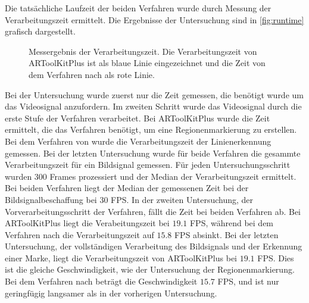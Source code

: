 Die tatsächliche Laufzeit der beiden Verfahren wurde durch Messung der Verarbeitungszeit ermittelt. Die Ergebnisse der Untersuchung sind in \autoref{fig:runtime} grafisch dargestellt.
\begin{figure}[!ht]
	\centering
	
	\caption{Messergebnis der Verarbeitungszeit. Die Verarbeitungszeit von ARToolKitPlus ist als blaue Linie
	 eingezeichnet und die Zeit von dem Verfahren nach \citeauthor{hirzer08} als rote Linie.}
	\label{fig:runtime}
\end{figure}
 Bei der Untersuchung wurde zuerst nur die Zeit gemessen, die benötigt wurde um das Videosignal anzufordern. Im zweiten
 Schritt wurde das Videosignal durch die erste Stufe der Verfahren verarbeitet. Bei ARToolKitPlus wurde die Zeit
 ermittelt, die das Verfahren  benötigt, um eine Regionenmarkierung zu erstellen. Bei dem
 Verfahren von \citeauthor{hirzer08} wurde die Verarbeitungszeit der Linienerkennung gemessen. Bei der letzten
 Untersuchung wurde für beide Verfahren die gesammte Verarbeitungszeit für ein Bildsignal gemessen. Für jeden
 Untersuchungsschritt wurden $300$ Frames prozessiert und der Median der Verarbeitungszeit ermittelt. Bei beiden
 Verfahren liegt der Median der gemessenen Zeit bei der Bildsignalbeschaffung bei $30$ FPS. In der zweiten
 Untersuchung, der Vorverarbeitungsschritt der Verfahren, fällt die Zeit bei beiden Verfahren ab. Bei ARToolKitPlus
 liegt die Verabeitungszeit bei $19.1$ FPS, während bei dem Verfahren nach \citeauthor{hirzer08} die Verarbeitungszeit
 auf $15.8$ FPS absinkt. Bei der letzten Untersuchung, der vollständigen Verarbeitung des Bildsignals und der Erkennung
 einer Marke, liegt die Verarbeitungszeit von ARToolKitPlus bei $19.1$ FPS. Dies ist die gleiche Geschwindigkeit, wie
 der Untersuchung der Regionenmarkierung. Bei dem Verfahren nach \citeauthor{hirzer08} beträgt die Geschwindigkeit
 $15.7$ FPS, und ist nur geringfügig langsamer als in der vorherigen Untersuchung.

